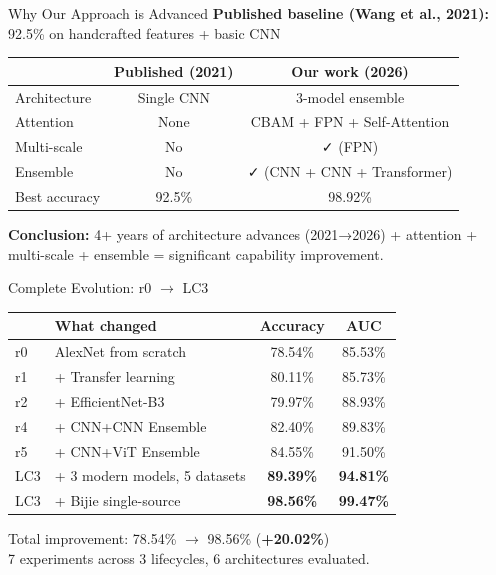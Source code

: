 \documentclass[aspectratio=169]{beamer}
\begin{document}
\begin{frame}{Why Our Approach is Advanced}
    \textbf{Published baseline (Wang et al., 2021):} 92.5\% on handcrafted features + basic CNN

    \vspace{0.2cm}
    \begin{table}
        \centering
        \small
        \begin{tabular}{lcc}
            \toprule
            & \textbf{Published (2021)} & \textbf{Our work (2026)} \\
            \midrule
            Architecture & Single CNN & 3-model ensemble \\
            Attention & None & CBAM + FPN + Self-Attention \\
            Multi-scale & No & ✓ (FPN) \\
            Ensemble & No & ✓ (CNN + CNN + Transformer) \\
            \midrule
            Best accuracy & 92.5\% & 98.92\% \\
            \bottomrule
        \end{tabular}
    \end{table}

    \vspace{0.2cm}
    \textbf{Conclusion:} 4+ years of architecture advances (2021→2026) + attention + multi-scale + ensemble = significant capability improvement.
\end{frame}

\begin{frame}{Complete Evolution: r0 $\to$ LC3}
    \begin{table}
        \centering
        \small
        \begin{tabular}{llcc}
            \toprule
            & \textbf{What changed} & \textbf{Accuracy} & \textbf{AUC} \\
            \midrule
            r0 & AlexNet from scratch & 78.54\% & 85.53\% \\
            r1 & + Transfer learning & 80.11\% & 85.73\% \\
            r2 & + EfficientNet-B3 & 79.97\% & 88.93\% \\
            r4 & + CNN+CNN Ensemble & 82.40\% & 89.83\% \\
            r5 & + CNN+ViT Ensemble & 84.55\% & 91.50\% \\
            \midrule
            LC3 & + 3 modern models, 5 datasets & \textbf{89.39\%} & \textbf{94.81\%} \\
            LC3 & + Bijie single-source & \textbf{98.56\%} & \textbf{99.47\%} \\
            \bottomrule
        \end{tabular}
    \end{table}

    \vspace{0.3cm}
    \centering
    Total improvement: 78.54\% $\to$ 98.56\% (\textbf{+20.02\%})\\
    7 experiments across 3 lifecycles, 6 architectures evaluated.
\end{frame}
\end{document}
